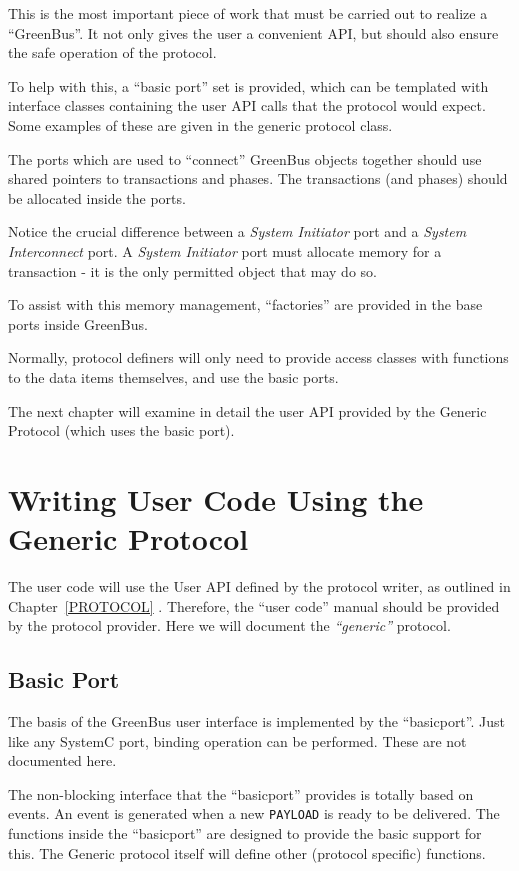 \documentclass[12pt,oneside]{gsbook}
\newcommand{\master}{{\em System Initiator}\xspace}
\newcommand{\router}{{\em System Interconnect}\xspace}
\begin{document}
This is the most important piece of work that must be carried out to realize a
``GreenBus''. It not only gives the user a convenient API, but should also
ensure the safe operation of the protocol.
 
To help with this, a ``basic port'' set is provided, which can be templated with
interface classes containing the user API calls that the protocol would
expect. Some examples of these are given in the generic protocol class.

The ports which are used to ``connect'' GreenBus objects together should use
shared pointers to transactions and phases. The transactions (and phases) should
be allocated inside the ports.

Notice the crucial difference between a \master port and a \router port. A
\master port must allocate memory for a transaction - it is the only
permitted object that may do so.

To assist with this memory management, ``factories'' are provided in the base
ports inside GreenBus.

Normally, protocol definers will only need to provide access classes with functions to the data
items themselves, and use the basic ports.

The next chapter will examine in detail the user API provided by the
Generic Protocol (which uses the basic port).


\chapter{Writing User Code Using the Generic Protocol}
\label{USER}

The user code will use the User API defined by the protocol writer, as
outlined in Chapter~\ref{PROTOCOL} . Therefore, the ``user code''
manual should be provided by the protocol provider.  Here we will
document the {\em ``generic''} protocol. 

\section{Basic Port}
\label{BASICPORT}

The basis of the GreenBus user interface is implemented by the
``basicport''.  Just like any SystemC  port, binding operation can be
performed. These are not documented here.

The non-blocking interface that the ``basicport'' provides is totally
based on events. An event is generated when a new {\tt PAYLOAD} is
ready to be delivered. The functions inside the ``basicport'' are
designed to provide the basic support for this. The Generic protocol
itself will define other (protocol specific) functions.
\end{document}
